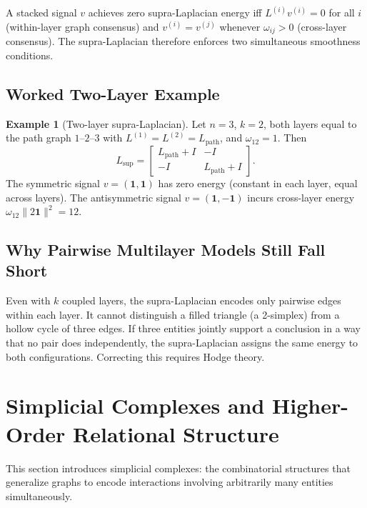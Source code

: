\documentclass[11pt]{article}
\theoremstyle{definition}
\newtheorem{example}[theorem]{Example}
\theoremstyle{remark}
\newcommand{\Lsup}{L_{\mathrm{sup}}}
\begin{document}
A stacked signal $v$ achieves zero supra-Laplacian energy iff $L^{(i)}v^{(i)}=0$
for all $i$ (within-layer graph consensus) and $v^{(i)}=v^{(j)}$ whenever
$\omega_{ij}>0$ (cross-layer consensus). The supra-Laplacian therefore enforces
two simultaneous smoothness conditions.

\subsection{Worked Two-Layer Example}

\begin{example}[Two-layer supra-Laplacian]
\label{ex:supra}
Let $n=3$, $k=2$, both layers equal to the path graph $1$--$2$--$3$ with
$L^{(1)}=L^{(2)}=L_{\mathrm{path}}$, and $\omega_{12}=1$. Then
\[
  \Lsup = \begin{bmatrix} L_{\mathrm{path}}+I & -I \\ -I & L_{\mathrm{path}}+I \end{bmatrix}.
\]
The symmetric signal $v=(\mathbf{1},\mathbf{1})$ has zero energy (constant in
each layer, equal across layers). The antisymmetric signal
$v=(\mathbf{1},-\mathbf{1})$ incurs cross-layer energy
$\omega_{12}\|2\mathbf{1}\|^2=12$.
\end{example}

\subsection{Why Pairwise Multilayer Models Still Fall Short}

Even with $k$ coupled layers, the supra-Laplacian encodes only pairwise edges
within each layer. It cannot distinguish a filled triangle (a 2-simplex) from a
hollow cycle of three edges. If three entities jointly support a conclusion in a
way that no pair does independently, the supra-Laplacian assigns the same energy
to both configurations. Correcting this requires Hodge theory.


\section{Simplicial Complexes and Higher-Order Relational Structure}
\label{sec:simplicial}

This section introduces simplicial complexes: the combinatorial structures that
generalize graphs to encode interactions involving arbitrarily many entities
simultaneously.
\end{document}
